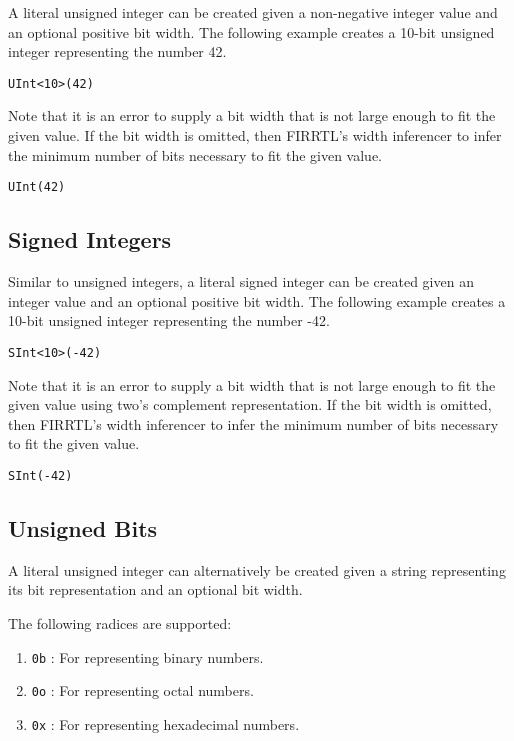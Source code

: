 \documentclass[12pt]{article}
\begin{document}
A literal unsigned integer can be created given a non-negative integer value and an optional positive bit width. The following example creates a 10-bit unsigned integer representing the number 42. 
\begin{verbatim}
UInt<10>(42)
\end{verbatim}

Note that it is an error to supply a bit width that is not large enough to fit the given value. If the bit width is omitted, then FIRRTL's width inferencer to infer the minimum number of bits necessary to fit the given value.
\begin{verbatim}
UInt(42)
\end{verbatim}

\subsection{Signed Integers}

Similar to unsigned integers, a literal signed integer can be created given an integer value and an optional positive bit width. The following example creates a 10-bit unsigned integer representing the number -42. 
\begin{verbatim}
SInt<10>(-42)
\end{verbatim}

Note that it is an error to supply a bit width that is not large enough to fit the given value using two's complement representation. If the bit width is omitted, then FIRRTL's width inferencer to infer the minimum number of bits necessary to fit the given value.
\begin{verbatim}
SInt(-42)
\end{verbatim}

\subsection{Unsigned Bits}

A literal unsigned integer can alternatively be created given a string representing its bit representation and an optional bit width. 

The following radices are supported:
\begin{enumerate}
\item \verb|0b| : For representing binary numbers.
\item \verb|0o| : For representing octal numbers.
\item \verb|0x| : For representing hexadecimal numbers.
\end{enumerate}
\end{document}
